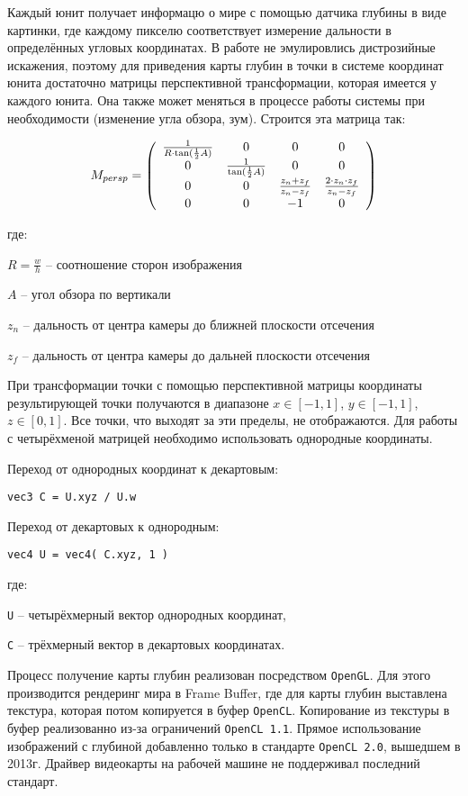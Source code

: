 Каждый юнит получает информацю о мире с помощью датчика глубины в виде картинки,
где каждому пикселю соответствует измерение дальности в определённых угловых координатах. В работе не эмулировлись
дистрозийные искажения, поэтому для приведения карты глубин в точки в системе координат юнита достаточно 
матрицы перспективной трансформации, которая имеется у каждого юнита. Она также может меняться в процессе работы
системы при необходимости (изменение угла обзора, зум). Строится эта матрица так:

$$
M_{persp} = \left( \begin{array}{c c c c}
        \frac{1}{ R \cdot \tan( \frac{1}{2} A ) } & 0 & 0 & 0 \\
        0 & \frac{1}{ \tan( \frac{1}{2} A ) } & 0 & 0 \\
        0 & 0 & \frac{ z_{n} + z_{f} }{ z_{n}-z_{f} } & \frac{ 2 \cdot z_{n} \cdot z_{f} }{ z_{n} - z_{f} } \\
        0 & 0 & -1 & 0
\end{array} \right)
$$

где:

$R = \frac{w}{h}$ -- соотношение сторон изображения

$A$ -- угол обзора по вертикали

$z_{n}$ -- дальность от центра камеры до ближней плоскости отсечения

$z_{f}$ -- дальность от центра камеры до дальней плоскости отсечения

При трансформации точки с помощью перспективной матрицы координаты результирующей точки
получаются в диапазоне $x \in [-1,1]$, $y \in [-1,1]$, $z \in [0,1]$. Все точки, что выходят
за эти пределы, не отображаются. Для работы с четырёхменой матрицей необходимо использовать
однородные координаты.

Переход от однородных координат к декартовым: 

\verb|vec3 C = U.xyz / U.w|

Переход от декартовых к однородным:

\verb|vec4 U = vec4( C.xyz, 1 )|

где:

\verb|U| -- четырёхмерный вектор однородных координат,

\verb|C| -- трёхмерный вектор в декартовых координатах.

\newpage

Процесс получение карты глубин реализован посредством \verb|OpenGL|. Для этого 
производится рендеринг мира в Frame Buffer, где для карты глубин выставлена текстура, 
которая потом копируется в буфер \verb|OpenCL|. Копирование из текстуры в буфер реализованно
из-за ограничений \verb|OpenCL 1.1|. Прямое использование изображений с глубиной добавленно
только в стандарте \verb|OpenCL 2.0|, вышедшем в 2013г. Драйвер видеокарты на рабочей машине
не поддерживал последний стандарт.

